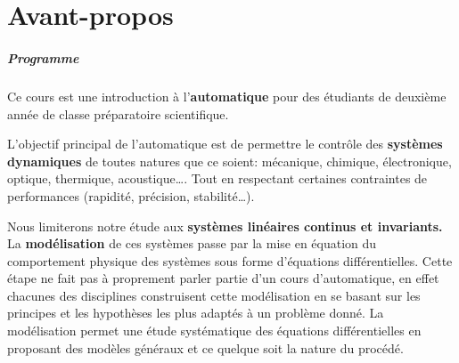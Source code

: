 \chapter*{Avant-propos}

\paragraph{Programme}

Ce cours est une introduction à l'\textbf{automatique}
pour des étudiants de deuxième année de classe préparatoire scientifique.

L'objectif principal de l'automatique est de permettre
le contrôle des \textbf{systèmes dynamiques}
de toutes natures que ce soient: mécanique, chimique, 
électronique, optique, thermique, acoustique\ldots.
Tout en respectant certaines contraintes de performances 
(rapidité, précision, stabilité\ldots).

Nous limiterons notre étude aux \textbf{systèmes linéaires continus et 
invariants.} La \textbf{modélisation} de ces systèmes passe par la mise 
en équation du comportement physique des systèmes sous forme d'équations 
différentielles. Cette étape ne fait pas à proprement parler partie d'un 
cours d'automatique, en effet chacunes des disciplines construisent cette 
modélisation en se basant sur les principes et les hypothèses les plus 
adaptés à un problème donné.
La modélisation permet une étude systématique des équations différentielles 
en proposant des modèles généraux et ce quelque soit la nature du procédé.

